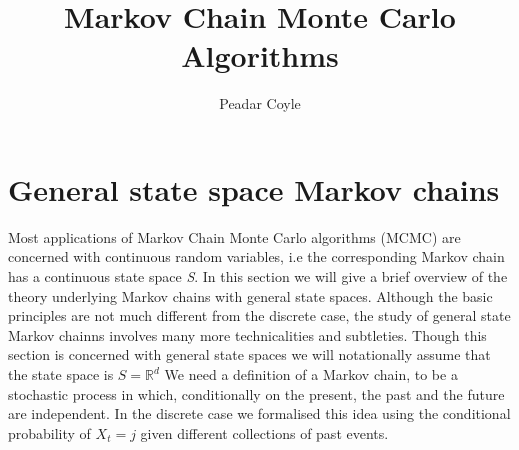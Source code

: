 \documentclass[a4paper,10pt]{article}
\title{Markov Chain Monte Carlo Algorithms}
\author{Peadar Coyle}
\begin{document}
\maketitle

\begin{abstract}

\end{abstract}

\section{General state space Markov chains}
Most applications of Markov Chain Monte Carlo algorithms (MCMC) 
are concerned with continuous random variables, i.e the corresponding Markov chain has a continuous state
space \textit{S}. In this section we will give a brief overview of the theory underlying Markov chains with
general state spaces. Although the basic principles are not much different from the discrete case, the study
of general state Markov chainns involves many more technicalities and subtleties. Though this section is concerned
with general state spaces we will notationally assume that the state space is $ S = \mathbb{R}^{d}$
   We need a definition of a Markov chain, to be a stochastic process in which, conditionally on the present, 
 the past and the future are independent. In the discrete case we formalised this idea using the conditional 
 probability of ${X_t = j}$ given different collections of past events. 
\end{document}
